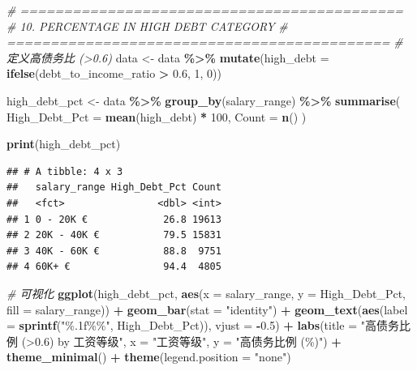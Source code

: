 \documentclass[
]{article}
\newenvironment{Shaded}{\begin{snugshade}}{\end{snugshade}}
\newcommand{\AttributeTok}[1]{\textcolor[rgb]{0.13,0.29,0.53}{#1}}
\newcommand{\CommentTok}[1]{\textcolor[rgb]{0.56,0.35,0.01}{\textit{#1}}}
\newcommand{\DecValTok}[1]{\textcolor[rgb]{0.00,0.00,0.81}{#1}}
\newcommand{\FloatTok}[1]{\textcolor[rgb]{0.00,0.00,0.81}{#1}}
\newcommand{\FunctionTok}[1]{\textcolor[rgb]{0.13,0.29,0.53}{\textbf{#1}}}
\newcommand{\NormalTok}[1]{#1}
\newcommand{\OtherTok}[1]{\textcolor[rgb]{0.56,0.35,0.01}{#1}}
\newcommand{\SpecialCharTok}[1]{\textcolor[rgb]{0.81,0.36,0.00}{\textbf{#1}}}
\newcommand{\StringTok}[1]{\textcolor[rgb]{0.31,0.60,0.02}{#1}}
\begin{document}
\begin{Shaded}
\begin{Highlighting}[]
\CommentTok{\# ============================================}
\CommentTok{\# 10. PERCENTAGE IN HIGH DEBT CATEGORY}
\CommentTok{\# ============================================}
\CommentTok{\# 定义高债务比 (\textgreater{}0.6)}
\NormalTok{data }\OtherTok{\textless{}{-}}\NormalTok{ data }\SpecialCharTok{\%\textgreater{}\%}
  \FunctionTok{mutate}\NormalTok{(}\AttributeTok{high\_debt =} \FunctionTok{ifelse}\NormalTok{(debt\_to\_income\_ratio }\SpecialCharTok{\textgreater{}} \FloatTok{0.6}\NormalTok{, }\DecValTok{1}\NormalTok{, }\DecValTok{0}\NormalTok{))}

\NormalTok{high\_debt\_pct }\OtherTok{\textless{}{-}}\NormalTok{ data }\SpecialCharTok{\%\textgreater{}\%}
  \FunctionTok{group\_by}\NormalTok{(salary\_range) }\SpecialCharTok{\%\textgreater{}\%}
  \FunctionTok{summarise}\NormalTok{(}
    \AttributeTok{High\_Debt\_Pct =} \FunctionTok{mean}\NormalTok{(high\_debt) }\SpecialCharTok{*} \DecValTok{100}\NormalTok{,}
    \AttributeTok{Count =} \FunctionTok{n}\NormalTok{()}
\NormalTok{  )}

\FunctionTok{print}\NormalTok{(high\_debt\_pct)}
\end{Highlighting}
\end{Shaded}

\begin{verbatim}
## # A tibble: 4 x 3
##   salary_range High_Debt_Pct Count
##   <fct>                <dbl> <int>
## 1 0 - 20K €             26.8 19613
## 2 20K - 40K €           79.5 15831
## 3 40K - 60K €           88.8  9751
## 4 60K+ €                94.4  4805
\end{verbatim}

\begin{Shaded}
\begin{Highlighting}[]
\CommentTok{\# 可视化}
\FunctionTok{ggplot}\NormalTok{(high\_debt\_pct, }\FunctionTok{aes}\NormalTok{(}\AttributeTok{x =}\NormalTok{ salary\_range, }\AttributeTok{y =}\NormalTok{ High\_Debt\_Pct, }\AttributeTok{fill =}\NormalTok{ salary\_range)) }\SpecialCharTok{+}
  \FunctionTok{geom\_bar}\NormalTok{(}\AttributeTok{stat =} \StringTok{"identity"}\NormalTok{) }\SpecialCharTok{+}
  \FunctionTok{geom\_text}\NormalTok{(}\FunctionTok{aes}\NormalTok{(}\AttributeTok{label =} \FunctionTok{sprintf}\NormalTok{(}\StringTok{"\%.1f\%\%"}\NormalTok{, High\_Debt\_Pct)), }
            \AttributeTok{vjust =} \SpecialCharTok{{-}}\FloatTok{0.5}\NormalTok{) }\SpecialCharTok{+}
  \FunctionTok{labs}\NormalTok{(}\AttributeTok{title =} \StringTok{"高债务比例 (\textgreater{}0.6) by 工资等级"}\NormalTok{,}
       \AttributeTok{x =} \StringTok{"工资等级"}\NormalTok{,}
       \AttributeTok{y =} \StringTok{"高债务比例 (\%)"}\NormalTok{) }\SpecialCharTok{+}
  \FunctionTok{theme\_minimal}\NormalTok{() }\SpecialCharTok{+}
  \FunctionTok{theme}\NormalTok{(}\AttributeTok{legend.position =} \StringTok{"none"}\NormalTok{)}
\end{Highlighting}
\end{Shaded}
\end{document}
